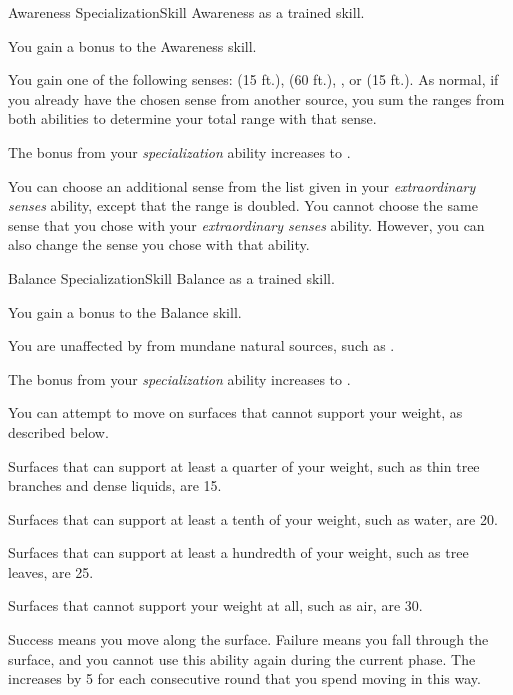   \begin{feat}{Awareness Specialization}{Skill}
    \featpre Awareness as a trained skill.

     You gain a  bonus to the Awareness skill.

     You gain one of the following senses:  (15 ft.),  (60 ft.), , or  (15 ft.).
    As normal, if you already have the chosen sense from another source, you sum the ranges from both abilities to determine your total range with that sense.

     The bonus from your \textit{specialization} ability increases to .

     You can choose an additional sense from the list given in your \textit{extraordinary senses} ability, except that the range is doubled.
    You cannot choose the same sense that you chose with your \textit{extraordinary senses} ability.
    However, you can also change the sense you chose with that ability.
  \end{feat}

  \begin{feat}{Balance Specialization}{Skill}
    \featpre Balance as a trained skill.

     You gain a  bonus to the Balance skill.

     You are unaffected by  from mundane natural sources, such as .

     The bonus from your \textit{specialization} ability increases to .

     You can attempt to move on surfaces that cannot support your weight, as described below.
    \begin{raggeditemize}
      \item Surfaces that can support at least a quarter of your weight, such as thin tree branches and dense liquids, are  15.
      \item Surfaces that can support at least a tenth of your weight, such as water, are  20.
      \item Surfaces that can support at least a hundredth of your weight, such as tree leaves, are  25.
      \item Surfaces that cannot support your weight at all, such as air, are  30.
    \end{raggeditemize}

    Success means you move along the surface.
    Failure means you fall through the surface, and you cannot use this ability again during the current phase.
    The  increases by 5 for each consecutive round that you spend moving in this way.
  \end{feat}

